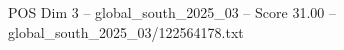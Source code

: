 \begin{textsample}{POS Dim 3 – global\_south\_2025\_03 – Score 31.00 – global\_south\_2025\_03/122564178.txt}
\end{textsample}

